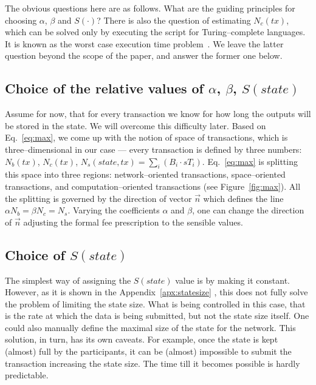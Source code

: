 \documentclass[]{llncs}   %
\newcommand{\authnote}[2]{\marginpar{\parbox{\marginparwidth}{\tiny %
  \textsf{#1 {\textcolor{blue}{notes: #2}}}}}%
  \textcolor{blue}{\textbf{\dag}}}
\newcommand{\authnote}[2]{
  \textsf{#1\textcolor{blue}{ #2}}}
\newcommand{\authnote}[2]{}
\newcommand{\dnote}[1]{{\authnote{\textcolor{red}{Dima notes:}}{#1}}}
\begin{document}
The obvious questions here are as follows. What are the guiding principles for
choosing $\alpha$, $\beta$ and $S(\cdot)$? There is also the
question of estimating $N_c(tx)$, which can be solved only by executing the
script for Turing--complete languages. It is known as the worst case execution
time problem~\cite{Wilhelm2008}.  We leave the latter question beyond the scope of
the paper, and answer the former one below.

\subsection{Choice of the relative values of $\alpha$, $\beta$, $S(state)$}

Assume for now, that for every transaction we know for how long the outputs will be
stored in the state. We will overcome this difficulty later. Based on
Eq.~\eqref{eq:max}, we come up with the notion of space of transactions, which
is three--dimensional in our case --- every transaction is defined by three
numbers: $N_b(tx)$, $N_c(tx)$, $N_s(state,tx) = \sum_i (B_i \cdot sT_i)$. Eq.~\eqref{eq:max} is splitting 
this space into three regions: network--oriented transactions, space--oriented transactions, 
and computation--oriented transactions (see Figure~\ref{fig:max}). All the splitting 
is governed by the direction of vector $\vec{n}$ which defines the line $\alpha N_b=\beta N_c=N_s$.
Varying the coefficients $\alpha$ and $\beta$, one can change the direction of
$\vec{n}$ adjusting the formal fee prescription to the sensible values.

\subsection{Choice of $S(state)$}

The simplest way of assigning the $S(state)$ value is by making it constant.
However, as it is shown in the Appendix~\ref{apx:statesize} \dnote{do we keep appendix?}, this does not fully solve
the problem of limiting the state size. What is being controlled in this case,
that is the rate at which the data is being submitted, but not the state size
itself. One could also manually define the maximal size of the state for the
network. This solution, in turn, has its own caveats. For example, once the
state is kept (almost) full by the participants, it can be (almost) impossible
to submit the transaction increasing the state size.  The time till it becomes
possible is hardly predictable. 
\end{document}
